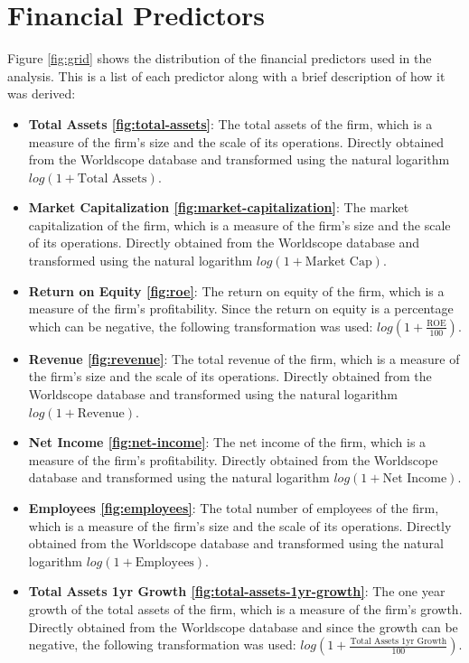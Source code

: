 \section{Financial Predictors}
Figure \ref{fig:grid} shows the distribution of the financial predictors used in the analysis. This is a list of each predictor along with a brief description of how it was derived:
\begin{itemize}
    \item \textbf{Total Assets \ref{fig:total-assets}}: The total assets of the firm, which is a measure of the firm's size and the scale of its operations. Directly obtained from the Worldscope database and transformed using the natural logarithm $log(1 + \text{Total Assets})$.
    \item \textbf{Market Capitalization \ref{fig:market-capitalization}}: The market capitalization of the firm, which is a measure of the firm's size and the scale of its operations. Directly obtained from the Worldscope database and transformed using the natural logarithm $log(1 + \text{Market Cap})$.
    \item \textbf{Return on Equity \ref{fig:roe}}: The return on equity of the firm, which is a measure of the firm's profitability. Since the return on equity is a percentage which can be negative, the following transformation was used: $log(1 + \frac{\text{ROE}}{100})$.
    \item \textbf{Revenue \ref{fig:revenue}}: The total revenue of the firm, which is a measure of the firm's size and the scale of its operations. Directly obtained from the Worldscope database and transformed using the natural logarithm $log(1 + \text{Revenue})$.
    \item \textbf{Net Income \ref{fig:net-income}}: The net income of the firm, which is a measure of the firm's profitability. Directly obtained from the Worldscope database and transformed using the natural logarithm $log(1 + \text{Net Income})$.
    \item \textbf{Employees \ref{fig:employees}}: The total number of employees of the firm, which is a measure of the firm's size and the scale of its operations. Directly obtained from the Worldscope database and transformed using the natural logarithm $log(1 + \text{Employees})$.
    \item \textbf{Total Assets 1yr Growth \ref{fig:total-assets-1yr-growth}}: The one year growth of the total assets of the firm, which is a measure of the firm's growth. Directly obtained from the Worldscope database and since the growth can be negative, the following transformation was used: $log(1 + \frac{\text{Total Assets 1yr Growth}}{100})$.

\end{itemize}
